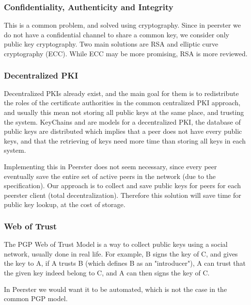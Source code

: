 \documentclass[]{article}
\begin{document}
            \subsubsection{Confidentiality, Authenticity and Integrity}
            This is a common problem, and solved using cryptography. Since in peerster we do not have a confidential channel to share a common key, we consider only public key cryptography. Two main solutions are RSA \cite{RFC8017} and elliptic curve cryptography (ECC). While ECC may be more promising, RSA is more reviewed.
            
            \subsubsection{Decentralized PKI}
            Decentralized PKIs already exist, and the main goal for them is to redistribute the roles of the certificate authorities in the common centralized PKI approach, and usually this mean not storing all public keys at the same place, and trusting the system. KeyChains \cite{morselli2006keychains} and \cite{aberer2005decentralised} are models for a decentralized PKI, the database of public keys are distributed which implies that a peer does not have every public keys, and that the retrieving of keys need more time than storing all keys in each system.
            
            Implementing this in Peerster does not seem necessary, since every peer eventually save the entire set of active peers in the network (due to the specification). Our approach is to collect and save public keys for peers for each peerster client (total decentralization). Therefore this solution will save time for public key lookup, at the cost of storage.
            
            \subsubsection{Web of Trust}
            \label{sec:related-work-wot}
            
            The PGP Web of Trust Model \cite{abdul1997pgp} is a way to collect public keys using a social network, usually done in real life. For example, B signs the key of C, and gives the key to A, if A trusts B (which defines B as an "introducer"), A can trust that the given key indeed belong to C, and A can then signs the key of C. 
            
            In Peerster we would want it to be automated, which is not the case in the common PGP model. 
            
\end{document}
